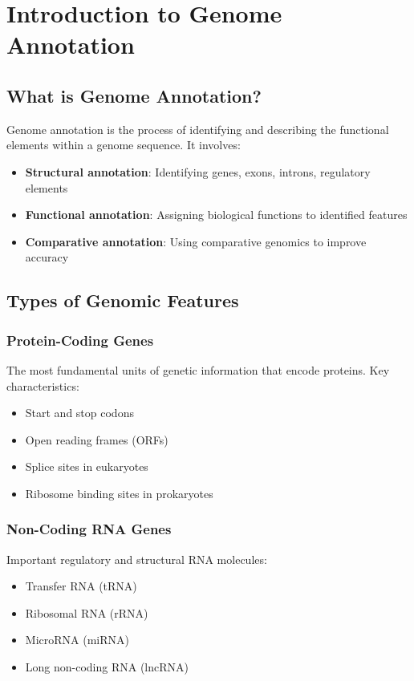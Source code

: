 
\section{Introduction to Genome Annotation}

\subsection{What is Genome Annotation?}

Genome annotation is the process of identifying and describing the functional elements within a genome sequence. It involves:

\begin{itemize}
    \item \textbf{Structural annotation}: Identifying genes, exons, introns, regulatory elements
    \item \textbf{Functional annotation}: Assigning biological functions to identified features
    \item \textbf{Comparative annotation}: Using comparative genomics to improve accuracy
\end{itemize}

\subsection{Types of Genomic Features}

\subsubsection{Protein-Coding Genes}
The most fundamental units of genetic information that encode proteins. Key characteristics:
\begin{itemize}
    \item Start and stop codons
    \item Open reading frames (ORFs)
    \item Splice sites in eukaryotes
    \item Ribosome binding sites in prokaryotes
\end{itemize}

\subsubsection{Non-Coding RNA Genes}
Important regulatory and structural RNA molecules:
\begin{itemize}
    \item Transfer RNA (tRNA)
    \item Ribosomal RNA (rRNA)
    \item MicroRNA (miRNA)
    \item Long non-coding RNA (lncRNA)
\end{itemize}

